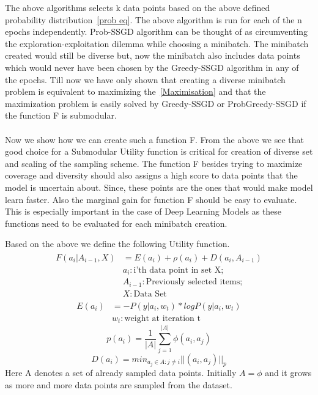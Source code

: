 \documentclass[a4paper,twoside]{iiththesis}
\theoremstyle{definition}
\theoremstyle{definition}
\theoremstyle{remark}
\begin{document}
The above algorithms selects k data points based on the above defined probability distribution~\ref{prob eq}. The above algorithm is run for each of the n epochs independently. Prob-SSGD algorithm can be thought of as circumventing the exploration-exploitation dilemma while choosing a minibatch. The minibatch created would still be diverse but, now the minibatch also includes data points which would never have been chosen by the Greedy-SSGD algorithm in any of the epochs.
Till now we have only shown that creating a diverse minibatch problem is equivalent to maximizing the~\ref{Maximisation} and that the maximization problem is easily solved by Greedy-SSGD or ProbGreedy-SSGD if the function F is submodular.
\\ \\
Now we show how we can create such a function F. From the above we see that good choice for a Submodular Utility function is critical for creation of diverse set and scaling of the sampling scheme. The function F besides trying to maximize coverage and diversity should also assigns a high score to data points that the model is uncertain about. Since, these points are the ones that would make model learn faster. Also the marginal gain for function F should be easy to evaluate. This is especially important in the case of Deep Learning Models as these functions need to be evaluated for each minibatch creation.

Based on the above we define the following Utility function.
\begin{align}
\begin{split}
     F(a_i|A_{i-1},X)&=E(a_i) + \rho(a_i) + D(a_i, A_{i-1})\\
     &a_i: \text{i'th data point in set X};\\
    &A_{i-1}: \text{Previously selected items};\\
    &X: \text{Data Set}
    \end{split}
    \end{align}
\begin{align}
  E(a_i) &= - P(y|a_i,w_t)*log P(y|a_i,w_t)\\
  & w_t: \text{weight at iteration t}
  \label{Entropy equation}
  \end{align}
  \begin{equation}
    p(a_i)= \frac{1}{|A|}\sum_{j=1}^{|A|} \phi(a_i, a_j) \label{Kernelised Distance}
    \end{equation}
\begin{equation}
    D(a_i)= min_{a_j\in A:j\neq i}||(a_i,a_j)||_p \label{Minimum Distance}
\end{equation}
Here A denotes a set of already sampled data points. Initially $A = {\phi}$ and it grows as more and more data points are sampled from the dataset.
\end{document}
